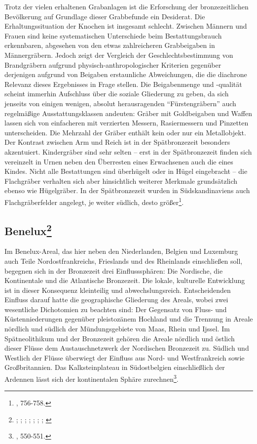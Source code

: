 \documentclass[openany,twoside,twocolumn]{book}
\let\rmarkdownfootnote\footnote%
\def\footnote{\protect\rmarkdownfootnote}
\begin{document}
Trotz der vielen erhaltenen Grabanlagen ist die Erforschung der
bronzezeitlichen Bevölkerung auf Grundlage dieser Grabbefunde ein
Desiderat. Die Erhaltungssituation der Knochen ist insgesamt schlecht.
Zwischen Männern und Frauen sind keine systematischen Unterschiede beim
Bestattungsbrauch erkennbaren, abgesehen von den etwas zahlreicheren
Grabbeigaben in Männergräbern. Jedoch zeigt der Vergleich der
Geschlechtsbestimmung von Brandgräbern aufgrund
physisch-anthropologischer Kriterien gegenüber derjenigen aufgrund von
Beigaben erstaunliche Abweichungen, die die diachrone Relevanz dieses
Ergebnisses in Frage stellen. Die Beigabenmenge und -qualität scheint
immerhin Aufschluss über die soziale Gliederung zu geben, da sich
jenseits von einigen wenigen, absolut herausragenden ``Fürstengräbern''
auch regelmäßige Ausstattungsklassen andeuten: Gräber mit Goldbeigaben
und Waffen lassen sich von einfacheren mit verzierten Messern,
Rasiermessern und Pinzetten unterscheiden. Die Mehrzahl der Gräber
enthält kein oder nur ein Metallobjekt. Der Kontrast zwischen Arm und
Reich ist in der Spätbronzezeit besonders akzentuiert. Kindergräber sind
sehr selten -- erst in der Spätbronzezeit finden sich vereinzelt in
Urnen neben den Überresten eines Erwachsenen auch die eines Kindes.
Nicht alle Bestattungen sind überhügelt oder in Hügel eingebracht -- die
Flachgräber verhalten sich aber hinsichtlich weiterer Merkmale
grundsätzlich ebenso wie Hügelgräber. In der Spätbronzezeit wurden in
Südskandinaviens auch Flachgräberfelder angelegt, je weiter südlich,
desto größer\footnote{\textcite{thrane_scandinavia_2013}, 756-758.}.

\hypertarget{benelux}{%
\subsection[Benelux]{\texorpdfstring{Benelux\footnote{\textcite{beek_circles_2014};
  \textcite{bourgeois_bronze_2008}; \textcite{drenth_mounds_2005};
  \textcite{fokkens_bronze_2013}; \textcite{fontijn_sacrificial_2002};
  \textcite{de_reu_land_2012}; \textcite{lohof_grafritueel_1991};
  \textcite{lohof_tradition_1994}}}{Benelux}}\label{benelux}}

Im Benelux-Areal, das hier neben den Niederlanden, Belgien und Luxemburg
auch Teile Nordostfrankreichs, Frieslands und des Rheinlands
einschließen soll, begegnen sich in der Bronzezeit drei Einflusssphären:
Die Nordische, die Kontinentale und die Atlantische Bronzezeit. Die
lokale, kulturelle Entwicklung ist in dieser Konsequenz kleinteilig und
abwechslungsreich. Entscheidenden Einfluss darauf hatte die
geographische Gliederung des Areals, wobei zwei wesentliche Dichotomien
zu beachten sind: Der Gegensatz von Fluss- und Küstenniederungen
gegenüber pleistozänem Hochland und die Trennung in Areale nördlich und
südlich der Mündungsgebiete von Maas, Rhein und Ijssel. Im
Spätneolithikum und der Bronzezeit gehören die Areale nördlich und
östlich dieser Flüsse dem Austauschnetzwerk der Nordischen Bronzezeit
zu. Südlich und Westlich der Flüsse überwiegt der Einfluss aus Nord- und
Westfrankreich sowie Großbritannien. Das Kalksteinplateau in
Südostbelgien einschließlich der Ardennen lässt sich der kontinentalen
Sphäre zurechnen\footnote{\textcite{fokkens_bronze_2013}, 550-551.}.
\end{document}
